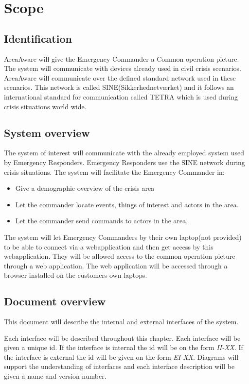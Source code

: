 \label{chp_scope}
\chapter{Scope}

\section{Identification}

AreaAware will give the Emergency Commander a Common operation picture. The system will communicate with devices already used in civil crisis scenarios. AreaAware will communicate over the defined standard network used in these scenarios. This
network is called SINE(Sikkerhednetværket) and it follows an international standard for communication called TETRA which is used during crisis situations world wide.

\section{System overview}
The system of interest will communicate with the already employed system used by Emergency Responders. Emergency Responders use the SINE network during crisis situations. The system will facilitate the Emergency Commander in:

\begin{itemize}
	\item  Give a demographic overview of the crisis area
	\item Let the commander locate events, things of interest and actors in the area.
	\item Let the commander send commands to actors in the area.
\end{itemize}

The system will let Emergency Commanders by their own laptop(not provided) to be able to connect via a webapplication and then get access by this webapplication. They will be allowed access to the common operation picture through a web application. The web application will be accessed through a browser installed on the customers own laptops.


\section{Document overview}
This document will describe the internal and external interfaces of the system.

Each interface will be described throughout this chapter. Each interface will be given a unique id. If the interface is internal the id will be on the form \emph{II-XX}. If the interface is external the id will be given on the form \emph{EI-XX}. Diagrams will support the understanding of interfaces and each interface description will be given a name and version number.

